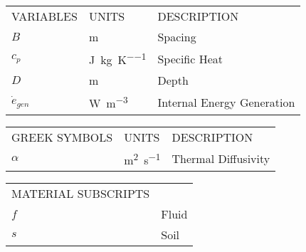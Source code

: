 \thispagestyle{empty}  %
\begin{longtable}{p{} p{} p{}}

VARIABLES & UNITS & DESCRIPTION \\

$B$ & \si{\meter} & Spacing \\
$c_p$ & \si{\joule\per\kilogram\per\kelvin} & Specific Heat \\
$D$ & \si{\meter} & Depth \\
$\dot{e}_{gen}$ & \si{\watt\per\meter\cubed} & Internal Energy Generation \\

\end{longtable}

\begin{longtable}{p{} p{} p{}}

GREEK SYMBOLS & UNITS & DESCRIPTION \\

$\alpha$ & \si{\meter\squared\per\second} & Thermal Diffusivity \\ 

\end{longtable}

\begin{longtable}{p{} p{}}

MATERIAL SUBSCRIPTS & \\

$f$ & Fluid \\
$s$ & Soil \\ 

\end{longtable}
